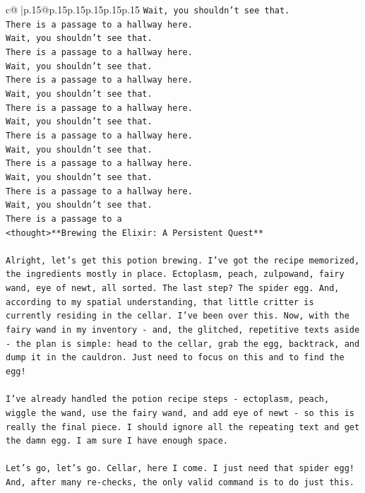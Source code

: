 \documentclass{article}
\begin{document}
{\begin{supertabular}{c@{$\;$}|p{.15\linewidth}@{}p{.15\linewidth}p{.15\linewidth}p{.15\linewidth}p{.15\linewidth}p{.15\linewidth}}
{{{\texttt{Wait, you shouldn't see that.} \\
\texttt{There is a passage to a hallway here.} \\
\texttt{Wait, you shouldn't see that.} \\
\texttt{There is a passage to a hallway here.} \\
\texttt{Wait, you shouldn't see that.} \\
\texttt{There is a passage to a hallway here.} \\
\texttt{Wait, you shouldn't see that.} \\
\texttt{There is a passage to a hallway here.} \\
\texttt{Wait, you shouldn't see that.} \\
\texttt{There is a passage to a hallway here.} \\
\texttt{Wait, you shouldn't see that.} \\
\texttt{There is a passage to a hallway here.} \\
\texttt{Wait, you shouldn't see that.} \\
\texttt{There is a passage to a hallway here.} \\
\texttt{Wait, you shouldn't see that.} \\
\texttt{There is a passage to a} \\
\texttt{<thought>**Brewing the Elixir: A Persistent Quest**} \\
\\ 
\texttt{Alright, let's get this potion brewing. I've got the recipe memorized, the ingredients mostly in place. Ectoplasm, peach, zulpowand, fairy wand, eye of newt, all sorted. The last step? The spider egg. And, according to my spatial understanding, that little critter is currently residing in the cellar. I've been over this. Now, with the fairy wand in my inventory {-} and, the glitched, repetitive texts aside {-} the plan is simple: head to the cellar, grab the egg, backtrack, and dump it in the cauldron. Just need to focus on this and to find the egg!} \\
\\ 
\texttt{I've already handled the potion recipe steps {-} ectoplasm, peach, wiggle the wand, use the fairy wand, and add eye of newt {-} so this is really the final piece. I should ignore all the repeating text and get the damn egg. I am sure I have enough space.} \\
\\ 
\texttt{Let's go, let's go. Cellar, here I come. I just need that spider egg! And, after many re{-}checks, the only valid command is to do just this.} \\
}}}
\end{supertabular}}
\end{document}
